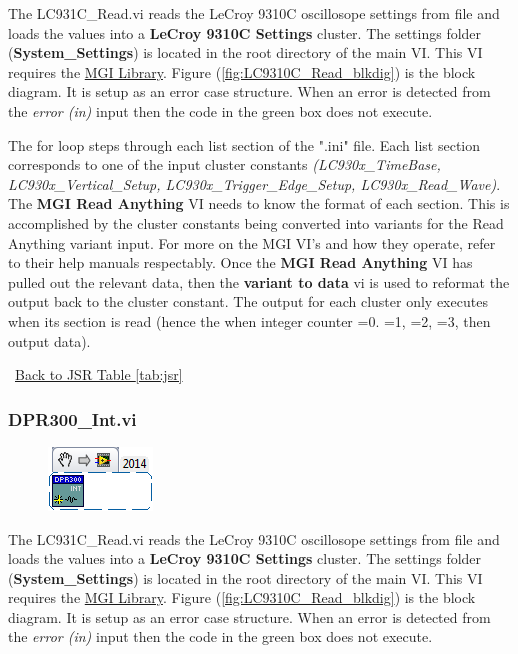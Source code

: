 \documentclass[11pt,a4paper,oldfontcommands]{memoir}
\begin{document}
The LC931C\_Read.vi reads the LeCroy 9310C oscillosope settings from file and loads the values into a \textbf{LeCroy 9310C Settings} cluster. The settings folder (\textbf{System\_Settings}) is located in the root directory of the main VI. This VI requires the \href{http://sine.ni.com/nips/cds/view/p/lang/en/nid/209753}{MGI Library}. Figure (\ref{fig:LC9310C_Read_blkdig}) is the block diagram.  It is setup as an error case structure. When an error is detected from the \textit{error (in)} input then the code in the green box does not execute.

The for loop steps through each list section of the ".ini" file. Each list section corresponds to one of the input cluster constants \textit{(LC930x\_TimeBase, LC930x\_Vertical\_Setup, LC930x\_Trigger\_Edge\_Setup, LC930x\_Read\_Wave)}. The \textbf{MGI Read Anything} VI needs to know the format of each section. This is accomplished by the cluster constants being converted into variants for the Read Anything variant input.  For more on the MGI VI's and how they operate, refer to their help manuals respectably. Once the \textbf{MGI Read Anything} VI has pulled out the relevant data, then the \textbf{variant to data} vi is used to reformat the output back to the cluster constant. The output for each cluster only executes when its section is read (hence the when integer counter =0. =1, =2, =3, then output data).

\noindent\hrulefill\, \hyperref[tab:jsr]{Back to JSR Table \ref{tab:jsr}}

\subsubsection{DPR300\_Int.vi} \label{DPR300_Int}
\noindent\hrulefill

\begin{figure}[h]
	\includegraphics[scale=0.625]{DPR300_Int_main_02}
	\label{fig:DPR300_Int_main_02}
\end{figure}

The LC931C\_Read.vi reads the LeCroy 9310C oscillosope settings from file and loads the values into a \textbf{LeCroy 9310C Settings} cluster. The settings folder (\textbf{System\_Settings}) is located in the root directory of the main VI. This VI requires the \href{http://sine.ni.com/nips/cds/view/p/lang/en/nid/209753}{MGI Library}. Figure (\ref{fig:LC9310C_Read_blkdig}) is the block diagram.  It is setup as an error case structure. When an error is detected from the \textit{error (in)} input then the code in the green box does not execute.
\end{document}
